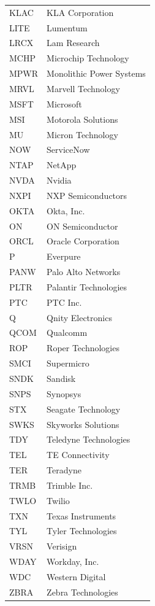 \documentclass[11pt,a4paper]{article}
\begin{document}
{\begin{longtable}{lp{11cm}}
KLAC & KLA Corporation \\
LITE & Lumentum \\
LRCX & Lam Research \\
MCHP & Microchip Technology \\
MPWR & Monolithic Power Systems \\
MRVL & Marvell Technology \\
MSFT & Microsoft \\
MSI & Motorola Solutions \\
MU & Micron Technology \\
NOW & ServiceNow \\
NTAP & NetApp \\
NVDA & Nvidia \\
NXPI & NXP Semiconductors \\
OKTA & Okta, Inc. \\
ON & ON Semiconductor \\
ORCL & Oracle Corporation \\
P & Everpure \\
PANW & Palo Alto Networks \\
PLTR & Palantir Technologies \\
PTC & PTC Inc. \\
Q & Qnity Electronics \\
QCOM & Qualcomm \\
ROP & Roper Technologies \\
SMCI & Supermicro \\
SNDK & Sandisk \\
SNPS & Synopsys \\
STX & Seagate Technology \\
SWKS & Skyworks Solutions \\
TDY & Teledyne Technologies \\
TEL & TE Connectivity \\
TER & Teradyne \\
TRMB & Trimble Inc. \\
TWLO & Twilio \\
TXN & Texas Instruments \\
TYL & Tyler Technologies \\
VRSN & Verisign \\
WDAY & Workday, Inc. \\
WDC & Western Digital \\
ZBRA & Zebra Technologies \\
\hline
\end{longtable}}
\end{document}
